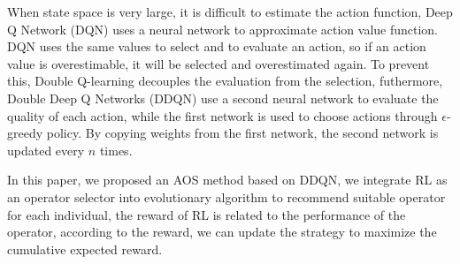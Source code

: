 \documentclass[journal]{IEEEtran}
\begin{document}
When state space is very large, it is difficult to estimate the action function, Deep Q Network (DQN) \cite{mnih2015human} uses a neural network to approximate action value function.
DQN uses the same values to select and to evaluate an action, so if an action value is overestimable, it will be selected and overestimated again. To prevent this, Double Q-learning \cite{hasselt2010double} decouples the evaluation from the selection,
futhermore, Double Deep Q Networks (DDQN) \cite{ddqn} use a second neural network to evaluate the quality of each action, while the first network is used to choose actions through $\epsilon$-greedy policy.
By copying weights from the first network, the second network is updated every $n$ times.

In this paper, we proposed an AOS method based on DDQN,
we integrate RL as an operator selector into evolutionary algorithm to recommend suitable operator for each individual, the reward of RL is related to the performance of the operator, according to the reward, we can update the strategy to maximize the cumulative expected reward.

\end{document}
